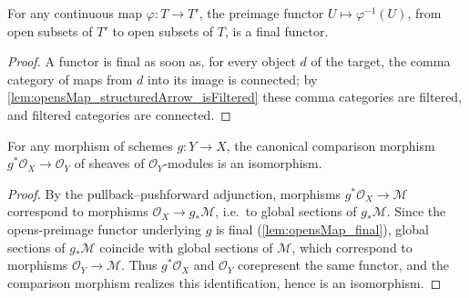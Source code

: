 \begin{lemma}\leanok
  \label{lem:opensMap_final}
  For any continuous map \(\varphi : T \to T'\), the preimage functor
  \(U \mapsto \varphi^{-1}(U)\), from open subsets of \(T'\) to open subsets of \(T\), is a
  final functor.
\end{lemma}
\begin{proof}\leanok
  A functor is final as soon as, for every object \(d\) of the target, the comma category of
  maps from \(d\) into its image is connected; by
  \cref{lem:opensMap_structuredArrow_isFiltered} these comma categories are filtered, and
  filtered categories are connected.
\end{proof}

\begin{lemma}\leanok
  \label{lem:module_pullback_unit_iso}
  For any morphism of schemes \(g : Y \to X\), the canonical comparison morphism
  \(g^*\mathcal{O}_X \to \mathcal{O}_Y\) of sheaves of \(\mathcal{O}_Y\)-modules is an
  isomorphism.
\end{lemma}
\begin{proof}\leanok
  By the pullback--pushforward adjunction, morphisms \(g^*\mathcal{O}_X \to \mathcal{M}\)
  correspond to morphisms \(\mathcal{O}_X \to g_*\mathcal{M}\), i.e.\ to global sections of
  \(g_*\mathcal{M}\). Since the opens-preimage functor underlying \(g\) is final
  (\cref{lem:opensMap_final}), global sections of \(g_*\mathcal{M}\) coincide with global
  sections of \(\mathcal{M}\), which correspond to morphisms \(\mathcal{O}_Y \to \mathcal{M}\).
  Thus \(g^*\mathcal{O}_X\) and \(\mathcal{O}_Y\) corepresent the same functor, and the
  comparison morphism realizes this identification, hence is an isomorphism.
\end{proof}

